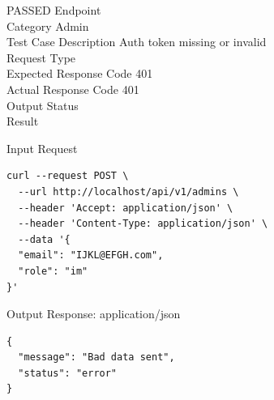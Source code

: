 \begin{testcase}{27}{PASSED}
Endpoint \hfill {}\\
Category \hfill Admin\\
Test Case Description \hfill Auth token missing or invalid\\

Request Type    \hfill {}\\
Expected Response Code    \hfill 401\\
Actual Response Code    \hfill 401\\

Output Status \hfill {}\\
Result \hfill {}

\begin{ipblock}{Input Request}
\begin{verbatim}
curl --request POST \
  --url http://localhost/api/v1/admins \
  --header 'Accept: application/json' \
  --header 'Content-Type: application/json' \
  --data '{
  "email": "IJKL@EFGH.com",
  "role": "im"
}'
\end{verbatim}
\end{ipblock}

\begin{opblock}{Output Response: application/json}
\begin{verbatim}
{
  "message": "Bad data sent",
  "status": "error"
}
\end{verbatim}
\end{opblock}
\end{testcase}

